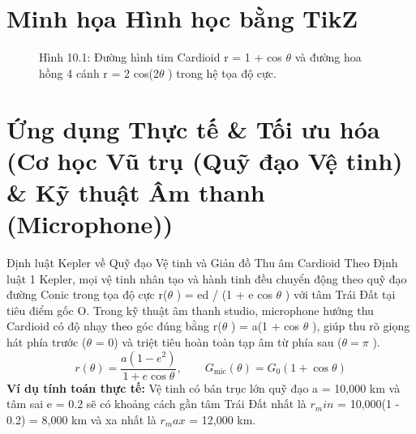 \documentclass[11pt,a4paper,oneside]{book}
\begin{document}
\section{Minh họa Hình học bằng TikZ}
\begin{figure}[htbp]
\centering
{}
\caption{Hình 10.1: Đường hình tim Cardioid r = 1 + cos $\theta$  và đường hoa hồng 4 cánh r = 2 cos(2$\theta$ ) trong hệ tọa độ cực.}
\label{fig:tikz-ch10-polar}
\end{figure}

\section{Ứng dụng Thực tế \& Tối ưu hóa (Cơ học Vũ trụ (Quỹ đạo Vệ tinh) \& Kỹ thuật Âm thanh (Microphone))}
\begin{ungdung}{Định luật Kepler về Quỹ đạo Vệ tinh và Giản đồ Thu âm Cardioid}
Theo Định luật 1 Kepler, mọi vệ tinh nhân tạo và hành tinh đều chuyển động theo quỹ đạo đường Conic trong tọa độ cực r($\theta$ ) = ed / (1 + e cos $\theta$ ) với tâm Trái Đất tại tiêu điểm gốc O. Trong kỹ thuật âm thanh studio, microphone hướng thu Cardioid có độ nhạy theo góc đúng bằng r($\theta$ ) = a(1 + cos $\theta$ ), giúp thu rõ giọng hát phía trước ($\theta$  = 0) và triệt tiêu hoàn toàn tạp âm từ phía sau ($\theta = \pi$ ).
\[ r(\theta) = \frac{a(1 - e^2)}{1 + e\cos\theta}, \qquad G_{\text{mic}}(\theta) = G_0 (1 + \cos\theta) \]
\noindent\textbf{Ví dụ tính toán thực tế:} Vệ tinh có bán trục lớn quỹ đạo a = 10,000 km và tâm sai e = 0.2 sẽ có khoảng cách gần tâm Trái Đất nhất là $r_min$ = 10,000(1 - 0.2) = 8,000 km và xa nhất là $r_max$ = 12,000 km.
\end{ungdung}
\end{document}
